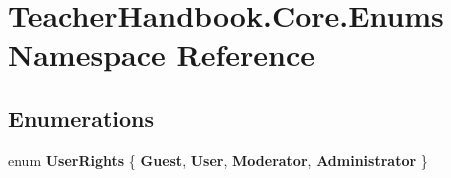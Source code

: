 \hypertarget{namespace_teacher_handbook_1_1_core_1_1_enums}{}\section{Teacher\+Handbook.\+Core.\+Enums Namespace Reference}
\label{namespace_teacher_handbook_1_1_core_1_1_enums}
\subsection*{Enumerations}
\begin{DoxyCompactItemize}
\item 
\mbox{\label{namespace_teacher_handbook_1_1_core_1_1_enums_a3bb1f3ee99d8144754e5d217f7bd2b38}} 
enum {\bfseries User\+Rights} \{ {\bfseries Guest}, 
{\bfseries User}, 
{\bfseries Moderator}, 
{\bfseries Administrator}
 \}
\end{DoxyCompactItemize}
